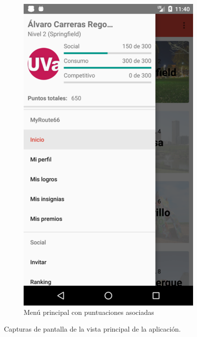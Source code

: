 \documentclass[twoside]{report}
\begin{document}
\begin{figure}[H]
\begin{center}
\begin{subfigure}[t]{.3\linewidth}
		\includegraphics[scale=0.25]{images/userguide/3.png}
		\caption{Menú principal con puntuaciones asociadas}
	\end{subfigure}
\caption{Capturas de pantalla de la vista principal de la aplicación.}
\end{center}
\end{figure}
\end{document}
